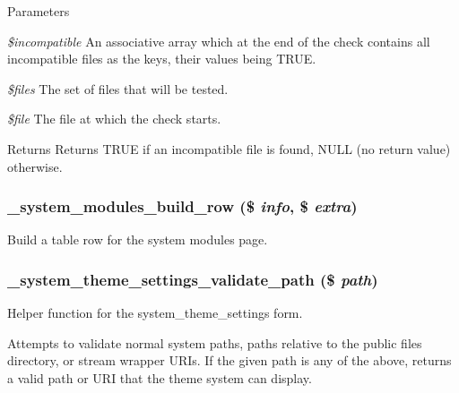 \begin{DoxyParams}{Parameters}
\item[{\em \$incompatible}]An associative array which at the end of the check contains all incompatible files as the keys, their values being TRUE. \item[{\em \$files}]The set of files that will be tested. \item[{\em \$file}]The file at which the check starts. \end{DoxyParams}
\begin{DoxyReturn}{Returns}
Returns TRUE if an incompatible file is found, NULL (no return value) otherwise. 
\end{DoxyReturn}
\hypertarget{system_8admin_8inc_ab84fc74aab734c723053e857b39ac570}{
\subsubsection[{\_\-system\_\-modules\_\-build\_\-row}]{\setlength{\rightskip}{0pt plus 5cm}\_\-system\_\-modules\_\-build\_\-row (\$ {\em info}, \/  \$ {\em extra})}}
\label{system_8admin_8inc_ab84fc74aab734c723053e857b39ac570}
Build a table row for the system modules page. \hypertarget{system_8admin_8inc_a6e0c509f421fa31a359aa17523d26c04}{
\subsubsection[{\_\-system\_\-theme\_\-settings\_\-validate\_\-path}]{\setlength{\rightskip}{0pt plus 5cm}\_\-system\_\-theme\_\-settings\_\-validate\_\-path (\$ {\em path})}}
\label{system_8admin_8inc_a6e0c509f421fa31a359aa17523d26c04}
Helper function for the system\_\-theme\_\-settings form.

Attempts to validate normal system paths, paths relative to the public files directory, or stream wrapper URIs. If the given path is any of the above, returns a valid path or URI that the theme system can display.


